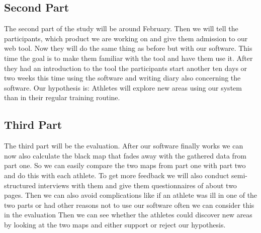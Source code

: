 \documentclass{sigchi}
\begin{document}
\subsection{Second Part}
The second part of the study will be around February. Then we will tell the participants, which product we are working on and give them admission to our web tool. Now they will do the same thing as before but with our software. This time the goal is to make them familiar with the tool and have them use it. After they had an introduction to the tool the participants start another ten days or two weeks this time using the software and writing diary also concerning the software. 
Our hypothesis is: Athletes will explore new areas using our system than in their regular training routine.
\subsection{Third Part}
The third part will be the evaluation. After our software finally works we can now also calculate the black map that fades away with the gathered data from part one. So we can easily compare the two maps from part one with part two and do this with each athlete. 
To get more feedback we will also conduct semi-structured interviews with them and give them questionnaires of about two pages. Then we can also avoid complications like if an athlete was ill in one of the two parts or had other reasons not to use our software often we can consider this in the evaluation
Then we can see whether the athletes could discover new areas by looking at the two maps and either support or reject our hypothesis.

\balance{}



\end{document}

